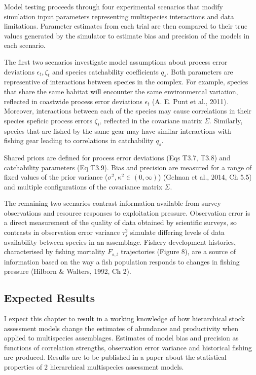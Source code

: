 \documentclass[12pt,]{scrartcl}
\begin{document}
Model testing proceeds through four experimental scenarios that modify
simulation input parameters representing multispecies interactions and
data limitations. Parameter estimates from each trial are then compared
to their true values generated by the simulator to estimate bias and
precision of the models in each scenario.

The first two scenarios investigate model assumptions about process
error deviations \(\epsilon_{t}, \zeta_t\) and species catchability
coefficients \(q_s\). Both parameters are representive of interactions
between species in the complex. For example, species that share the same
habitat will encounter the same environmental variation, reflected in
coastwide process error deviations \(\epsilon_t\) (A. E. Punt et al.,
2011). Moreover, interactions between each of the species may cause
correlations in their species speficic process errors \(\zeta_t\),
reflected in the covariane matrix \(\Sigma\). Similarly, species that
are fished by the same gear may have similar interactions with fishing
gear leading to correlations in catchability \(q_s\).

Shared priors are defined for process error deviations (Eqs T3.7, T3.8)
and catchability parameters (Eq T3.9). Bias and precision are measured
for a range of fixed values of the prior variance
(\(\sigma^2, \kappa^2 \in (0,\infty)\)) (Gelman et al., 2014, Ch 5.5)
and multiple configurations of the covariance matrix \(\Sigma\).

The remaining two scenarios contrast information available from survey
observations and resource responses to exploitation pressure.
Observation error is a direct measurement of the quality of data
obtained by scientific surveys, so contrasts in observation error
variance \(\tau_s^2\) simulate differing levels of data availability
between species in an assemblage. Fishery development histories,
characterised by fishing mortality \(F_{s,t}\) trajectories (Figure 8),
are a source of information based on the way a fish population responds
to changes in fishing pressure (Hilborn \& Walters, 1992, Ch 2).

\subsection{Expected Results}\label{expected-results}

I expect this chapter to result in a working knowledge of how
hierarchical stock assessment models change the estimates of abundance
and productivity when applied to multispecies assemblages. Estimates of
model bias and precision as functions of correlation strengths,
observation error variance and historical fishing are produced. Results
are to be published in a paper about the statistical properties of 2
hierarchical multispecies assessment models.
\end{document}
